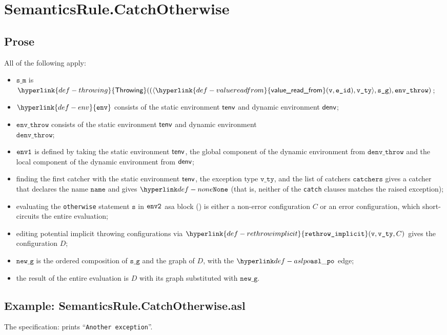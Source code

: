 \documentclass{book}
\newcommand\ProseOrError[0]{or an error configuration, which short-circuits the entire evaluation}
\newcommand\rethrowimplicit[0]{\hyperlink{def-rethrowimplicit}{\texttt{rethrow\_implicit}}}
\newcommand\valuereadfrom[0]{\hyperlink{def-valuereadfrom}{\textsf{value\_read\_from}}}
\newcommand\Throwing[0]{\hyperlink{def-throwing}{\textsf{Throwing}}}
\newcommand\env[0]{\hyperlink{def-env}{\texttt{env}}}
\newcommand\newg[0]{\texttt{new\_g}}
\newcommand\vs[0]{\texttt{s}}
\newcommand\name[0]{\texttt{name}}
\newcommand\catchers[0]{\texttt{catchers}}
\newcommand\envthrow[0]{\texttt{env\_throw}}
\newcommand\denvthrow[0]{\texttt{denv\_throw}}
\newcommand\sm[0]{\texttt{s\_m}}
\newcommand\sg[0]{\texttt{s\_g}}
\newcommand\vvty[0]{\texttt{v\_ty}}
\newcommand\eid[0]{\texttt{e\_id}}
\begin{document}
\section{SemanticsRule.CatchOtherwise \label{sec:SemanticsRule.CatchOtherwise}}
  \subsection{Prose}
  All of the following apply:
  \begin{itemize}
    \item $\sm$ is $\Throwing((\langle \valuereadfrom(\vv, \eid), \vvty \rangle, \sg), \envthrow)$;
    \item $\env$ consists of the static environment $\textsf{tenv}$ and dynamic environment $\textsf{denv}$;
    \item $\envthrow$ consists of the static environment $\textsf{tenv}$ and dynamic environment \\ $\denvthrow$;
    \item $\texttt{env1}$ is defined by taking the static environment $\textsf{tenv}$, the global component of the dynamic
    environment from $\denvthrow$ and the local component of the dynamic environment from $\textsf{denv}$;
    \item finding the first catcher with the static environment $\textsf{tenv}$, the exception type $\vvty$,
    and the list of catchers $\catchers$ gives a catcher that declares the name $\name$ and gives $\None$
    (that is, neither of the \texttt{catch} clauses matches the raised exception);
    \item evaluating the \texttt{otherwise} statement $\vs$ in $\texttt{env2}$ asa block ()
    is either a non-error configuration $C$ \ProseOrError;
    \item editing potential implicit throwing configurations via $\rethrowimplicit(\vv, \vvty, C)$
    gives the configuration $D$;
    \item $\newg$ is the ordered composition of $\sg$ and the graph of $D$,
    with the $\aslpo$ edge;
    \item the result of the entire evaluation is $D$ with its graph substituted with $\newg$.
  \end{itemize}

    \subsection{Example: SemanticsRule.CatchOtherwise.asl}
     The specification:
     prints ``\texttt{Another exception}''.
\end{document}

